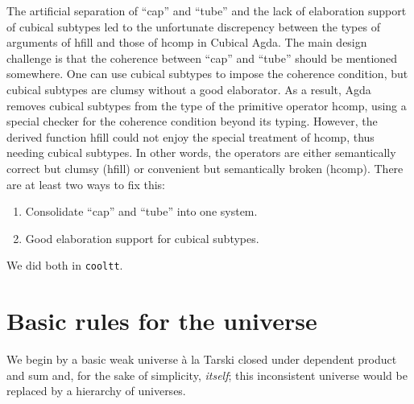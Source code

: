 \documentclass[draft]{amsart}
\begin{document}
\begin{remark}
  The artificial separation of ``cap'' and ``tube'' and the lack of elaboration support of cubical subtypes led to the unfortunate discrepency between the types of arguments of \textsf{hfill} and those of \textsf{hcomp} in Cubical Agda. The main design challenge is that the coherence between ``cap'' and ``tube'' should be mentioned somewhere. One can use cubical subtypes to impose the coherence condition, but cubical subtypes are clumsy without a good elaborator. As a result, Agda removes cubical subtypes from the type of the primitive operator \textsf{hcomp}, using a special checker for the coherence condition beyond its typing. However, the derived function \textsf{hfill} could not enjoy the special treatment of \textsf{hcomp}, thus needing cubical subtypes. In other words, the operators are either semantically correct but clumsy (\textsf{hfill}) or convenient but semantically broken (\textsf{hcomp}). There are at least two ways to fix this:
  \begin{enumerate}
    \item Consolidate ``cap'' and ``tube'' into one system.
    \item Good elaboration support for cubical subtypes.
  \end{enumerate}
  We did both in \texttt{cooltt}.
\end{remark}

\section{Basic rules for the universe}

We begin by a basic weak universe \`a la Tarski closed under dependent product
and sum and, for the sake of simplicity, \emph{itself}; this inconsistent
universe would be replaced by a hierarchy of universes.
\end{document}
